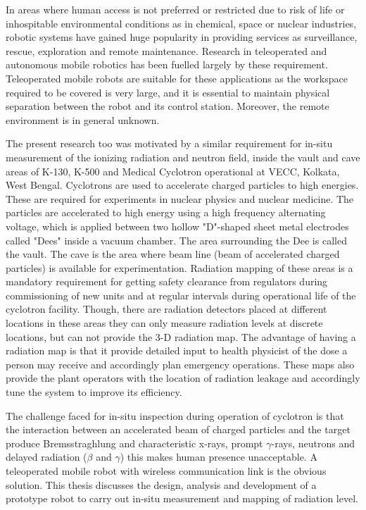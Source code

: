  In areas where human access is not preferred or restricted  due to risk of life or inhospitable environmental conditions as in chemical, space or nuclear industries, robotic systems have gained huge popularity in providing services as surveillance, rescue, exploration and remote maintenance.  Research in teleoperated and autonomous mobile robotics has been fuelled largely by these  requirement. Teleoperated mobile robots are suitable for these applications  as the workspace required to be covered is very large, and it is essential to maintain  physical separation between the robot and its control station. Moreover, the remote environment is in general unknown. 
 
 The present research too was motivated by a similar requirement for in-situ measurement of the ionizing radiation and  neutron field, inside the vault and cave areas of   K-130,  K-500  and Medical Cyclotron operational at VECC, Kolkata, West Bengal. Cyclotrons are used to accelerate  charged particles to high energies. These are required for experiments in nuclear physics and nuclear medicine. The particles are accelerated to high energy using a high frequency alternating voltage, which is applied between two hollow "D"-shaped sheet metal electrodes called "Dees" inside a vacuum chamber. The area surrounding the Dee is called the vault.  The cave is the area where beam line (beam of  accelerated charged particles) is available for experimentation. Radiation mapping of these areas is a  mandatory requirement for getting safety clearance from regulators during  commissioning of new units and at regular intervals during operational life of the cyclotron facility.   Though, there are radiation detectors placed at different locations in these areas they can only measure radiation levels at discrete locations, but can not provide the 3-D radiation  map. The advantage of having a  radiation map is that it  provide detailed  input to health physicist  of the dose a person may receive and accordingly plan emergency  operations. These maps also provide the plant operators with the location of radiation leakage and accordingly tune the system to improve its efficiency.

The challenge faced for in-situ inspection during operation of cyclotron is that the interaction  between  an  accelerated  beam   of  charged  particles  and  the  target  produce Bremsstraghlung and characteristic x-rays, prompt $\gamma$-rays, neutrons and delayed radiation ($\beta $ and $\gamma$) this makes human presence unacceptable.  A teleoperated mobile robot with wireless communication link is the obvious solution. This thesis discusses the design, analysis and development of a prototype robot  to carry out in-situ measurement and mapping of radiation level.
% 

